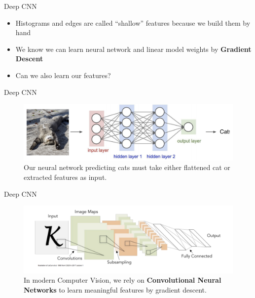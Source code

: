\begin{frame}{Deep CNN}
\begin{itemize}
    \item Histograms and edges are called “shallow” features because we build them by hand
    \item We know we can learn neural network and linear model weights by \textbf{Gradient Descent}
    \item Can we also learn our features?
\end{itemize}
\end{frame}

\begin{frame}{Deep CNN}
\begin{figure}
    \centering
    \includegraphics[width=1\textwidth]{img/catNN.png}
    \caption{Our neural network predicting cats must take either flattened cat or extracted features as input.}
\end{figure}
\end{frame}

\begin{frame}{Deep CNN}
\begin{figure}
    \centering
    \includegraphics[width=1\textwidth]{img/dcnn.png}
    \caption{In modern Computer Vision, we rely on \textbf{Convolutional Neural Networks} to learn meaningful features by gradient descent.}
\end{figure}
\end{frame}

